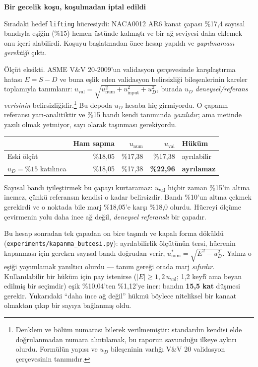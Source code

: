 \documentclass[11pt,a4paper]{article}
\newcommand{\kkkenar}{lacivert}
\newcommand{\kkzemin}{kod}
\newenvironment{renkkutu}[3]{%
  \renewcommand{\kkkenar}{#1}\renewcommand{\kkzemin}{#2}%
  \par\medskip\noindent
  \begin{lrbox}{\kutugovde}%
  \begin{minipage}{\dimexpr\linewidth-2\fboxsep-2\fboxrule\relax}\footnotesize
  \textcolor{#1}{\textbf{#3}}\par\vspace{3pt}%
}{%
  \end{minipage}%
  \end{lrbox}%
  \noindent\fcolorbox{\kkkenar}{\kkzemin}{\usebox{\kutugovde}}%
  \par\medskip
}
\newenvironment{reddedilir}[1]{\begin{renkkutu}{kotu}{kotubg}{#1}}{\end{renkkutu}}
\begin{document}
\begin{reddedilir}{Bir gecelik koşu, koşulmadan iptal edildi}
Sıradaki hedef \texttt{lifting} hücresiydi: NACA0012 AR6 kanat çapası
\%17{,}4 sayısal bandıyla eşiğin (\%15) hemen üstünde kalmıştı ve bir ağ
seviyesi daha eklemek onu içeri alabilirdi. Koşuyu başlatmadan önce hesap
yapıldı ve \emph{yapılmaması gerektiği} çıktı.

Ölçüt eksikti. ASME V\&V 20-2009'un validasyon çerçevesinde karşılaştırma
hatası $E = S - D$ ve buna eşlik eden validasyon belirsizliği bileşenlerinin
kareler toplamıyla tanımlanır:
$u_{\mathrm{val}} = \sqrt{u_{\mathrm{num}}^2 + u_{\mathrm{input}}^2 + u_D^2}$,
burada $u_D$ \emph{deneysel/referans verisinin} belirsizliğidir.\footnote{Denklem
ve bölüm numarası bilerek verilmemiştir: standardın kendisi elde
doğrulanmadan numara alıntılamak, bu raporun savunduğu ilkeye aykırı olurdu.
Formülün yapısı ve $u_D$ bileşeninin varlığı V\&V 20 validasyon çerçevesinin
tanımıdır.} Bu depoda $u_D$ hesaba hiç girmiyordu. O çapanın referansı yarı-analitiktir ve \%15 bandı
kendi tanımında \emph{yazılıdır}; ama metinde yazılı olmak yetmiyor, sayı
olarak taşınması gerekiyordu.

\begin{center}\footnotesize
\begin{tabular}{@{}lrrrl@{}}
\toprule
& \textbf{Ham sapma} & \textbf{$u_{\mathrm{num}}$} & \textbf{$u_{\mathrm{val}}$} & \textbf{Hüküm} \\
\midrule
Eski ölçüt & \%18{,}05 & \%17{,}38 & \%17{,}38 & ayrılabilir \\
$u_D=\%15$ katılınca & \%18{,}05 & \%17{,}38 & \textbf{\%22{,}96} & \textbf{ayrılamaz} \\
\bottomrule
\end{tabular}
\end{center}

\noindent Sayısal bandı iyileştirmek bu çapayı kurtaramaz: $u_{\mathrm{val}}$
hiçbir zaman \%15'in altına inemez, çünkü referansın kendisi o kadar
belirsizdir. Bandı \%10'un altına çekmek gerekirdi ve o noktada bile marj
\%18{,}05'e karşı \%18{,}0 olurdu. Hücreyi ölçüme çevirmenin yolu daha ince
ağ değil, \emph{deneysel referanslı} bir çapadır.

Bu hesap sonradan tek çapadan on bire taşındı ve kapalı forma döküldü
(\texttt{experiments/kapanma\_butcesi.py}): ayrılabilirlik ölçütünün tersi,
hücrenin kapanması için gereken sayısal bandı doğrudan verir,
$u_{\mathrm{num}}^{*} = \sqrt{E^2 - u_D^2}$. Yalnız o eşiği yayımlamak
yanıltıcı olurdu --- tanım gereği orada marj \emph{sıfırdır}. Kullanılabilir
bir hüküm için pay istenirse ($|E| \ge 1{,}2\,u_{\mathrm{val}}$; 1{,}2 keyfî
ama beyan edilmiş bir seçimdir) eşik \%10{,}04'ten \%1{,}12'ye iner: bandın
\textbf{15{,}5 kat} düşmesi gerekir. Yukarıdaki ``daha ince ağ değil'' hükmü
böylece niteliksel bir kanaat olmaktan çıkıp bir sayıya bağlanmış oldu.


\end{reddedilir}
\end{document}
